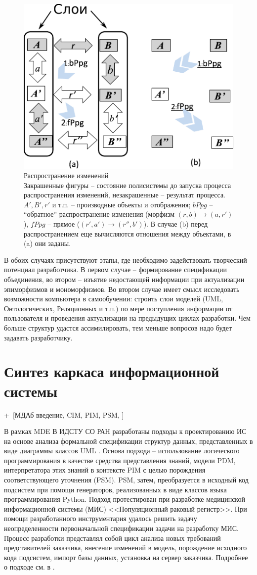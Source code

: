 \documentclass[11pt,draft]{ltxdoc}
\newcommand{\aaa}[2][acolor]{\noindent\textcolor{eclr}%
{+\ [}\textcolor{#1}{#2}\textcolor{eclr}{]}}
\begin{document}
\begin{figure}[htbp]
  \centering
  \includegraphics[width=0.5\linewidth]{propagation}
  \caption{Распространение изменений\\[0.3em]
    \footnotesize{Закрашенные фигуры -- состояние полисистемы до запуска
      процесса распространения изменений, незакрашенные -- результат процесса.
      $A',B',r'$ и т.п. -- производные объекты и отображения; $bPpg$ --
      ``обратное'' распространение изменения (морфизм $(r,b)\to (a,r')$), $fPpg$
      -- прямое ($(r',a')\to (r'',b')$).  В случае (b) перед распространением
      еще вычисляются отношения между объектами, в (a) они заданы.}}
  \label{fig:propagation}
\end{figure}


В обоих случаях присутствуют этапы, где необходимо задействовать творческий потенциал разработчика.
В первом случае -- формирование спецификации объединения, во втором -- изъятие
недостающей информации при актуализации эпиморфизмов и мономорфизмов.  Во втором
случае имеет смысл исследовать возможности компьютера в самообучении: строить
слои моделей (UML, Онтологических, Реляционных и т.п.) по мере поступления
информации от пользователя и проведения актуализации на предыдущих циклах
разработки.  Чем больше структур удастся ассимилировать, тем меньше вопросов
надо будет задавать разработчику.

\section{Синтез каркаса информационной системы}
\label{sec:mdasynthesis}

\aaa{МДАб введение, CIM, PIM, PSM, \cite{Yurin,me,slv,fmonogr}}

В рамках MDE В ИДСТУ СО РАН разработаны подходы к проектированию ИС на основе
анализа формальной спецификации структур данных, представленных в виде диаграммы
классов UML \cite{}.  Основа подхода -- использование логического
программирования в качестве средства представления знаний, модели PDM,
интерпретатора этих знаний в контексте PIM с целью порождения соответствующего
уточнения (PSM).  PSM, затем, преобразуется в исходный код подсистем при помощи
генераторов, реализованных в виде классов языка программирования Python.  Подход
протестирован при разработке медицинской информационной системы (МИС) <<Популяционный
раковый регистр>>.  При помощи разработанного инструментария удалось решить
задачу неопределенности первоначальной спецификации задачи на разработку МИС.
Процесс разработки представлял собой цикл анализа новых требований
представителей заказчика, внесение изменений в модель, порождение исходного кода
подсистем, импорт базы данных, установка на сервер заказчика.  Подробнее о
подходе см. в \cite{fmonog}.
\end{document}
